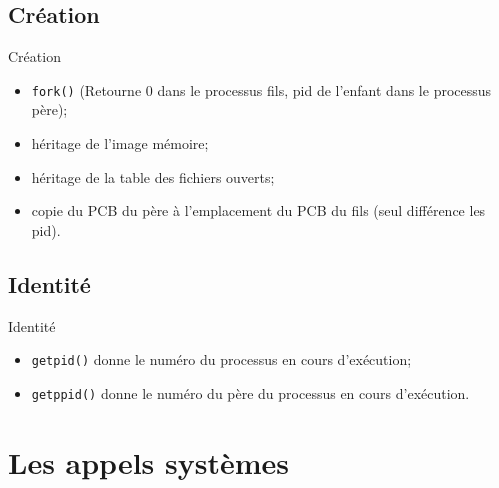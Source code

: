 \begin{frame}{\sectitle}

\def\subsectitle{Création}
\subsection{\subsectitle}

\begin{block}{\subsectitle}
\begin{itemize}
    \item \texttt{fork()} (Retourne 0 dans le processus fils, pid de l'enfant
    dans le processus père);
    \item héritage de l'image mémoire;
    \item héritage de la table des fichiers ouverts;
    \item copie du PCB du père à l'emplacement du PCB du fils (seul différence
    les pid).
\end{itemize}
\end{block}

\def\subsectitle{Identité}
\subsection{\subsectitle}

\begin{block}{\subsectitle}
\begin{itemize}
    \item \texttt{getpid()} donne le numéro du processus en cours d'exécution;
    \item \texttt{getppid()} donne le numéro du père du processus en cours
    d'exécution.
\end{itemize}
\end{block}

\end{frame}

\def\sectitle{Les appels systèmes}
\section{\sectitle}

